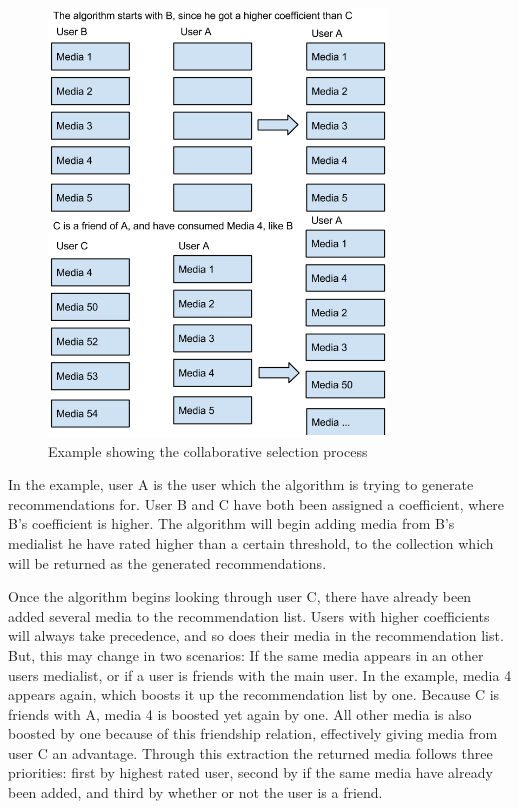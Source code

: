 \begin{figure}[htb]
\centering
\includegraphics[width=0.8\textwidth]{Images/CollaborativeRecExample.png}
\caption{Example showing the collaborative selection process}
\label{CollaEx}
\end{figure}

In the example, user A is the user which the algorithm is trying to generate recommendations for. User B and C have both been assigned a coefficient, where B’s coefficient is higher. The algorithm will begin adding media from B’s medialist he have rated higher than a certain threshold, to the collection which will be returned as the generated recommendations.

Once the algorithm begins looking through user C, there have already been added several media to the recommendation list. Users with higher coefficients will always take precedence, and so does their media in the recommendation list. But, this may change in two scenarios: If the same media appears in an other users medialist, or if a user is friends with the main user. In the example, media 4 appears again, which boosts it up the recommendation list by one. Because C is friends with A, media 4 is boosted yet again by one. All other media is also boosted by one because of this friendship relation, effectively giving media from user C an advantage. Through this extraction the returned media follows three priorities: first by highest rated user, second by if the same media have already been added, and third by whether or not the user is a friend.